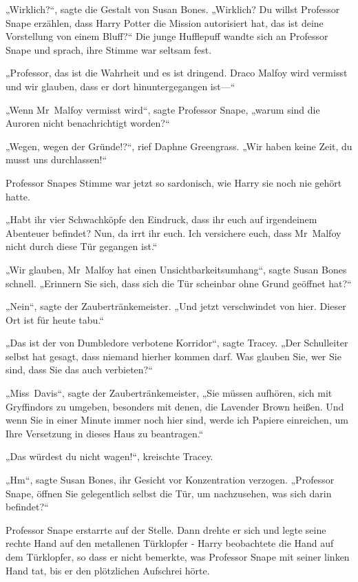 {„Wirklich?“, sagte die Gestalt von Susan Bones. „Wirklich? Du willst Professor Snape erzählen, dass Harry Potter die Mission autorisiert hat, das ist deine Vorstellung von einem Bluff?“ Die junge Hufflepuff wandte sich an Professor Snape und sprach, ihre Stimme war seltsam fest.

„Professor, das ist die Wahrheit und es ist dringend. Draco Malfoy wird vermisst und wir glauben, dass er dort hinuntergegangen ist—“

„Wenn Mr~Malfoy vermisst wird“, sagte Professor Snape, „warum sind die Auroren nicht benachrichtigt worden?“

„Wegen, wegen der Gründe!?“, rief Daphne Greengrass. „Wir haben keine Zeit, du musst uns durchlassen!“

Professor Snapes Stimme war jetzt so sardonisch, wie Harry sie noch nie gehört hatte.

„Habt ihr vier Schwachköpfe den Eindruck, dass ihr euch auf irgendeinem Abenteuer befindet? Nun, da irrt ihr euch. Ich versichere euch, dass Mr~Malfoy nicht durch diese Tür gegangen ist.“

„Wir glauben, Mr~Malfoy hat einen Unsichtbarkeitsumhang“, sagte Susan Bones schnell. „Erinnern Sie sich, dass sich die Tür scheinbar ohne Grund geöffnet hat?“

„Nein“, sagte der Zaubertränkemeister. „Und jetzt verschwindet von hier. Dieser Ort ist für heute tabu.“

„Das ist der von Dumbledore verbotene Korridor“, sagte Tracey. „Der Schulleiter selbst hat gesagt, dass niemand hierher kommen darf. Was glauben Sie, wer Sie sind, dass Sie das auch verbieten?“

„Miss~Davis“, sagte der Zaubertränkemeister, „Sie müssen aufhören, sich mit Gryffindors zu umgeben, besonders mit denen, die Lavender Brown heißen. Und wenn Sie in einer Minute immer noch hier sind, werde ich Papiere einreichen, um Ihre Versetzung in dieses Haus zu beantragen.“

„Das würdest du nicht wagen!“, kreischte Tracey.

„Hm“, sagte Susan Bones, ihr Gesicht vor Konzentration verzogen. „Professor Snape, öffnen Sie gelegentlich selbst die Tür, um nachzusehen, was sich darin befindet?“

Professor Snape erstarrte auf der Stelle. Dann drehte er sich und legte seine rechte Hand auf den metallenen Türklopfer - Harry beobachtete die Hand auf dem Türklopfer, so dass er nicht bemerkte, was Professor Snape mit seiner linken Hand tat, bis er den plötzlichen Aufschrei hörte.

}
